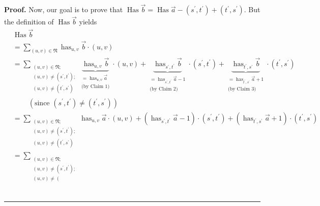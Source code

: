 \documentclass
[numbers=enddot,12pt,final,onecolumn,notitlepage,abstracton]{scrartcl}%
\theoremstyle{definition}
\newenvironment{proof}[1][Proof]{\noindent\textbf{#1.} }{\ \rule{0.5em}{0.5em}}
\let\sumnonlimits\sum
\renewcommand{\sum}{\sumnonlimits\limits}
\begin{document}
\begin{proof}
Now, our goal is to prove that $\operatorname*{Has}\overrightarrow{b}%
=\operatorname*{Has}\overrightarrow{a}-\left(  s^{\prime},t^{\prime}\right)
+\left(  t^{\prime},s^{\prime}\right)  $. But the definition of
$\operatorname*{Has}\overrightarrow{b}$ yields%
\begin{align*}
&  \operatorname*{Has}\overrightarrow{b}\\
&  =\sum_{\left(  u,v\right)  \in\mathfrak{N}}\operatorname*{has}%
\nolimits_{u,v}\overrightarrow{b}\cdot\left(  u,v\right) \\
&  =\sum_{\substack{\left(  u,v\right)  \in\mathfrak{N};\\\left(  u,v\right)
\neq\left(  s^{\prime},t^{\prime}\right)  ;\\\left(  u,v\right)  \neq\left(
t^{\prime},s^{\prime}\right)  }}\underbrace{\operatorname*{has}\nolimits_{u,v}%
\overrightarrow{b}}_{\substack{=\operatorname*{has}\nolimits_{u,v}%
\overrightarrow{a}\\\text{(by Claim 1)}}}\cdot\left(  u,v\right)
+\underbrace{\operatorname*{has}\nolimits_{s^{\prime},t^{\prime}%
}\overrightarrow{b}}_{\substack{=\operatorname*{has}\nolimits_{s^{\prime
},t^{\prime}}\overrightarrow{a}-1\\\text{(by Claim 2)}}}\cdot\left(
s^{\prime},t^{\prime}\right)  +\underbrace{\operatorname*{has}%
\nolimits_{t^{\prime},s^{\prime}}\overrightarrow{b}}%
_{\substack{=\operatorname*{has}\nolimits_{t^{\prime},s^{\prime}%
}\overrightarrow{a}+1\\\text{(by Claim 3)}}}\cdot\left(  t^{\prime},s^{\prime
}\right) \\
&  \ \ \ \ \ \ \ \ \ \ \left(  \text{since }\left(  s^{\prime},t^{\prime
}\right)  \neq\left(  t^{\prime},s^{\prime}\right)  \right) \\
&  =\sum_{\substack{\left(  u,v\right)  \in\mathfrak{N};\\\left(  u,v\right)
\neq\left(  s^{\prime},t^{\prime}\right)  ;\\\left(  u,v\right)  \neq\left(
t^{\prime},s^{\prime}\right)  }}\operatorname*{has}\nolimits_{u,v}%
\overrightarrow{a}\cdot\left(  u,v\right)  +\left(  \operatorname*{has}%
\nolimits_{s^{\prime},t^{\prime}}\overrightarrow{a}-1\right)  \cdot\left(
s^{\prime},t^{\prime}\right)  +\left(  \operatorname*{has}\nolimits_{t^{\prime
},s^{\prime}}\overrightarrow{a}+1\right)  \cdot\left(  t^{\prime},s^{\prime
}\right) \\
&  =\sum_{\substack{\left(  u,v\right)  \in\mathfrak{N};\\\left(  u,v\right)
\neq\left(  s^{\prime},t^{\prime}\right)  ;\\\left(  u,v\right)  \neq\left(
}}
\end{align*}
\end{proof}
\end{document}
